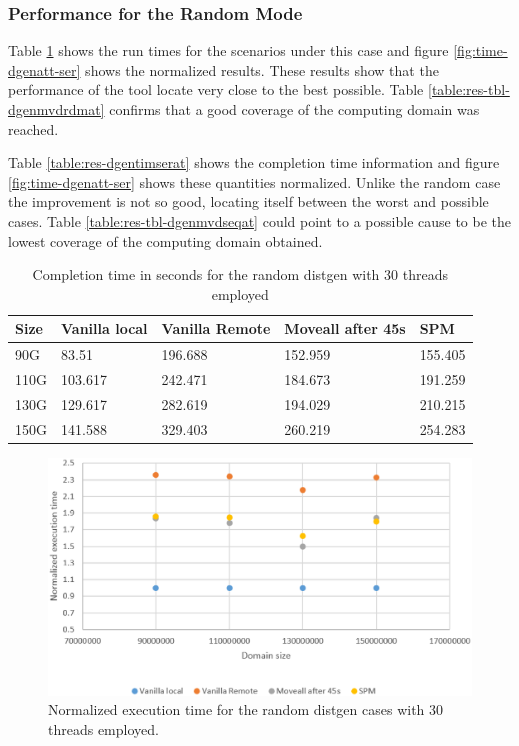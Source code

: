 \subsubsection{Performance for the Random Mode}\label{subsection:time-dgenat-random.eps}

Table \ref{table:res-dgentimrdmat} shows the run times for the scenarios under this case and figure \ref{fig:time-dgenatt-ser} shows the normalized results. These results show that the performance of the tool locate very close to the best possible. Table \ref{table:res-tbl-dgenmvdrdmat} confirms that a good coverage of the computing domain was reached.

Table \ref{table:res-dgentimserat} shows the completion time information and figure \ref{fig:time-dgenatt-ser} shows these quantities normalized. Unlike the random case the improvement is not so good, locating itself between the worst and possible cases. Table \ref{table:res-tbl-dgenmvdseqat} could point to a possible cause to be the lowest coverage of the computing domain obtained.

\begin{table}[th]
	\centering
		\begin{tabularx}{\textwidth}{|l|l|l|l|X|}
		\hline
			Size & Vanilla local & Vanilla Remote & Moveall after 45s & SPM \\
			\hline
			90G & 83.51 & 196.688 & 152.959 & 155.405\\
			\hline
			110G & 103.617 & 242.471 & 184.673 & 191.259\\
			\hline
			130G & 129.617 & 282.619 &194.029 & 210.215\\
			\hline
			150G & 141.588 & 329.403 & 260.219 & 254.283\\
			\hline
		\end{tabularx}
		\caption{Completion time in seconds for the random distgen with 30 threads employed}
		\label{table:res-dgentimrdmat}
\end{table}

\begin{figure}[th]
	\centering
		\includegraphics[width=.8\textwidth]{figures/time-dgenat-random.eps}
		\caption{Normalized execution time for the random distgen cases with 30 threads employed.}
		\label{fig:res-dgentimrdmat}
\end{figure}



